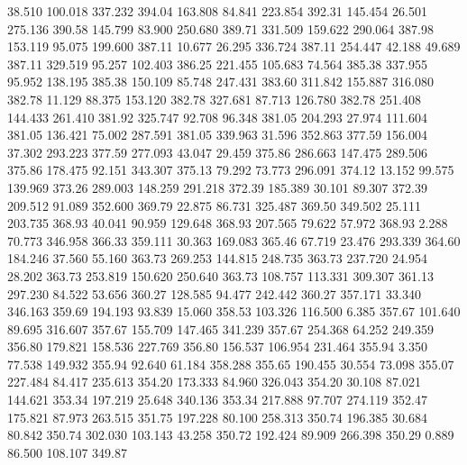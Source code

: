   38.510  100.018  337.232       394.04
 163.808   84.841  223.854       392.31
 145.454   26.501  275.136       390.58
 145.799   83.900  250.680       389.71
 331.509  159.622  290.064       387.98
 153.119   95.075  199.600       387.11
  10.677   26.295  336.724       387.11
 254.447   42.188   49.689       387.11
 329.519   95.257  102.403       386.25
 221.455  105.683   74.564       385.38
 337.955   95.952  138.195       385.38
 150.109   85.748  247.431       383.60
 311.842  155.887  316.080       382.78
  11.129   88.375  153.120       382.78
 327.681   87.713  126.780       382.78
 251.408  144.433  261.410       381.92
 325.747   92.708   96.348       381.05
 204.293   27.974  111.604       381.05
 136.421   75.002  287.591       381.05
 339.963   31.596  352.863       377.59
 156.004   37.302  293.223       377.59
 277.093   43.047   29.459       375.86
 286.663  147.475  289.506       375.86
 178.475   92.151  343.307       375.13
  79.292   73.773  296.091       374.12
  13.152   99.575  139.969       373.26
 289.003  148.259  291.218       372.39
 185.389   30.101   89.307       372.39
 209.512   91.089  352.600       369.79
  22.875   86.731  325.487       369.50
 349.502   25.111  203.735       368.93
  40.041   90.959  129.648       368.93
 207.565   79.622   57.972       368.93
   2.288   70.773  346.958       366.33
 359.111   30.363  169.083       365.46
  67.719   23.476  293.339       364.60
 184.246   37.560   55.160       363.73
 269.253  144.815  248.735       363.73
 237.720   24.954   28.202       363.73
 253.819  150.620  250.640       363.73
 108.757  113.331  309.307       361.13
 297.230   84.522   53.656       360.27
 128.585   94.477  242.442       360.27
 357.171   33.340  346.163       359.69
 194.193   93.839   15.060       358.53
 103.326  116.500    6.385       357.67
 101.640   89.695  316.607       357.67
 155.709  147.465  341.239       357.67
 254.368   64.252  249.359       356.80
 179.821  158.536  227.769       356.80
 156.537  106.954  231.464       355.94
   3.350   77.538  149.932       355.94
  92.640   61.184  358.288       355.65
 190.455   30.554   73.098       355.07
 227.484   84.417  235.613       354.20
 173.333   84.960  326.043       354.20
  30.108   87.021  144.621       353.34
 197.219   25.648  340.136       353.34
 217.888   97.707  274.119       352.47
 175.821   87.973  263.515       351.75
 197.228   80.100  258.313       350.74
 196.385   30.684   80.842       350.74
 302.030  103.143   43.258       350.72
 192.424   89.909  266.398       350.29
   0.889   86.500  108.107       349.87
